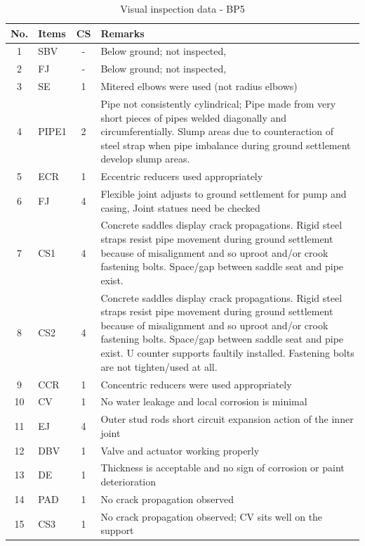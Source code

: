 \begin{table}[!h]
	\caption{Visual inspection data - BP5}
	\label{ch04_visualinspectionbp5}
		{\scriptsize
\begin{tabular}{c|l|c|p{12cm}}
\hline
No. & Items & CS & Remarks \\ 
\hline
1 & SBV & - & Below ground; not inspected,  \\ 
2 & FJ & - & Below ground; not inspected, \\ 
3 & SE & 1 & Mitered elbows were used (not radius elbows) \\ 
4 & PIPE1 & 2 & Pipe not consistently cylindrical; Pipe made from very short pieces of pipes welded diagonally and circumferentially. Slump areas due to counteraction of steel strap when pipe imbalance during ground settlement develop slump areas. \\ 
5 & ECR & 1 & Eccentric reducers used appropriately \\ 
6 & FJ & 4 & Flexible joint adjusts to ground settlement for pump and casing, Joint statues need be checked \\ 
7 & CS1 & 4 & Concrete saddles display crack propagations. Rigid steel straps resist pipe movement during ground settlement because of misalignment and so uproot and/or crook fastening bolts. Space/gap between saddle seat and pipe exist. \\ 
8 & CS2 & 4 & Concrete saddles display crack propagations. Rigid steel straps resist pipe movement during ground settlement because of misalignment and so uproot and/or crook fastening bolts. Space/gap between saddle seat and pipe exist. U counter supports faultily installed. Fastening bolts are not tighten/used at all. \\ 
9 & CCR & 1 & Concentric reducers were used appropriately \\ 
10 & CV & 1 & No water leakage and local corrosion is minimal \\ 
11 & EJ & 4 & Outer stud rods short circuit expansion action of the inner joint \\ 
12 & DBV & 1 & Valve and actuator working properly  \\ 
13 & DE & 1 & Thickness is acceptable and no sign of corrosion or paint deterioration \\ 
14 & PAD & 1 & No crack propagation observed \\ 
15 & CS3 & 1 & No crack propagation observed; CV sits well on the support  \\ 
\hline
\end{tabular}
	}
\end{table}


